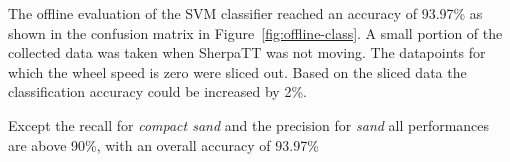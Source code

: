 \documentclass{article}
\begin{document}
The offline evaluation of the SVM classifier reached an accuracy of 93.97\% as shown in the confusion matrix in Figure~\ref{fig:offline-class}. A small portion of the collected data was taken when SherpaTT was not moving. The datapoints for which the wheel speed is zero were sliced out. Based on the sliced data the classification accuracy could be increased by 2\%.

Except the recall for \emph{compact sand} and the precision for \emph{sand} all performances are above 90\%, with an overall accuracy of 93.97\%



\end{document}
